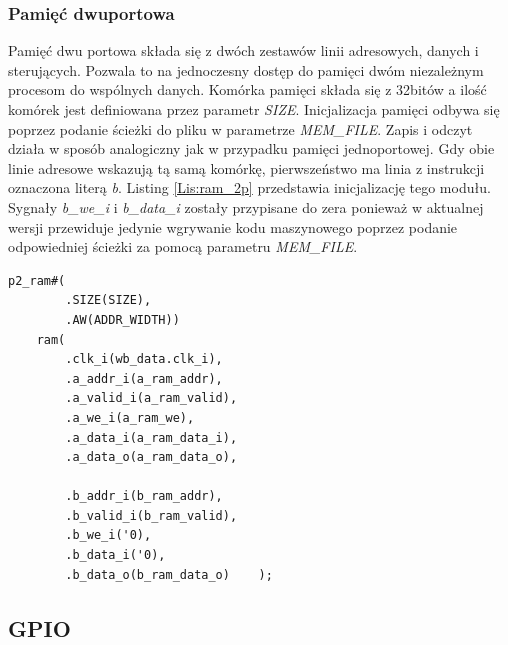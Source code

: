 \documentclass[11pt,a4paper]{article}
\begin{document}
		\subsubsection{Pamięć dwuportowa}
			\hspace{5mm}
			Pamięć dwu portowa składa się z dwóch zestawów linii adresowych, danych i sterujących. Pozwala to na jednoczesny dostęp do pamięci dwóm niezależnym procesom do wspólnych danych. Komórka pamięci składa się z 32bitów a ilość komórek jest definiowana przez parametr \textit{SIZE}. Inicjalizacja pamięci odbywa się poprzez podanie ścieżki do pliku w parametrze \textit{MEM\_FILE}. Zapis i odczyt działa w sposób analogiczny jak w przypadku pamięci jednoportowej. Gdy obie linie adresowe wskazują tą samą komórkę, pierwszeństwo ma linia z instrukcji oznaczona literą \textit{b}. Listing \ref{Lis:ram_2p} przedstawia inicjalizację tego modułu. Sygnały \textit{b\_we\_i} i \textit{b\_data\_i} zostały przypisane do zera ponieważ w aktualnej wersji przewiduje jedynie wgrywanie kodu maszynowego poprzez podanie odpowiedniej ścieżki za pomocą parametru \textit{MEM\_FILE}.\\
						\begin{minipage}{\textwidth}
\begin{scriptsize}
\begin{lstlisting}[label=Lis:ram_2p,caption=Inicjalizacja dwuportowej pamięci RAM]
    p2_ram#(
        .SIZE(SIZE),
        .AW(ADDR_WIDTH))
    ram(
        .clk_i(wb_data.clk_i),
        .a_addr_i(a_ram_addr),
        .a_valid_i(a_ram_valid),
        .a_we_i(a_ram_we),
        .a_data_i(a_ram_data_i),
        .a_data_o(a_ram_data_o),
		
        .b_addr_i(b_ram_addr),
        .b_valid_i(b_ram_valid),
        .b_we_i('0),
        .b_data_i('0),
        .b_data_o(b_ram_data_o)    );
\end{lstlisting}
\end{scriptsize}
\end{minipage}

	\subsection{GPIO}
\end{document}
